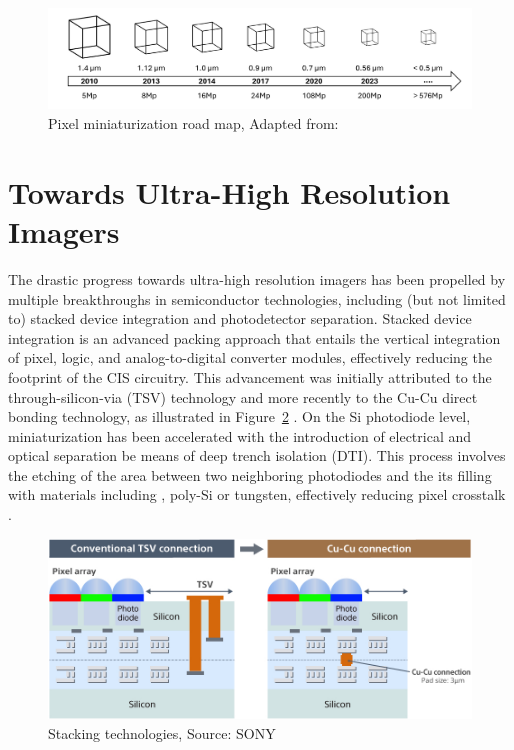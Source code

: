 \begin{figure}
  \centering
  \medskip
  \includegraphics[width=.99\textwidth]{chapters/introduction/image/pixel_miniaturization.pdf}
  \caption[Short caption for Table of Figures]{Pixel miniaturization road map, Adapted from: \cite{SookyoungRoh2025Dispersion-engineeredSensors}}
  \label{fig:ch1:pixel_size}
\end{figure}

\section{Towards Ultra-High Resolution Imagers}

The drastic progress towards ultra-high resolution imagers has been propelled by multiple breakthroughs in semiconductor technologies, including (but not limited to) stacked device integration and photodetector separation. Stacked device integration is an advanced packing approach that entails the vertical integration of pixel, logic, and analog-to-digital converter modules, effectively reducing the footprint of the CIS circuitry. This advancement was initially attributed to the through-silicon-via (TSV) technology and more recently to the Cu-Cu direct bonding technology, as illustrated in Figure~\ref{fig:ch1:stacking_technologies} \cite{Kagawa20193DSensors}. On the Si photodiode level, miniaturization has been accelerated with the introduction of electrical and optical separation be means of deep trench isolation (DTI). This process involves the etching of the area between two neighboring photodiodes and the its filling with materials including , poly-Si or tungsten, effectively reducing pixel crosstalk \cite{Ahn2014AGate, Okawa2019ALevel, Kim2020ATechnology, Park20217.9Isolation}.   

\begin{figure}
  \centering
  \medskip
  \includegraphics[width=.8\textwidth]{chapters/introduction/image/stacking.jpg}
  \caption[Short caption for Table of Figures]{Stacking technologies, Source: SONY}
  \label{fig:ch1:stacking_technologies} 
\end{figure}



